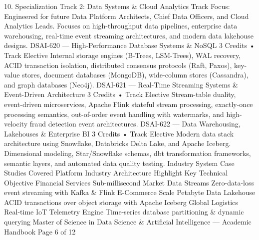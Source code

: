 \documentclass[12pt]{article}
\begin{document}
10. Specialization Track 2: Data Systems \& Cloud Analytics
Track Focus: Engineered for future Data Platform Architects, Chief Data Officers, and Cloud Analytics Leads.
Focuses on high-throughput data pipelines, enterprise data warehousing, real-time event streaming
architectures, and modern data lakehouse designs.
DSAI-620 — High-Performance Database Systems \& NoSQL
3 Credits • Track Elective
Internal storage engines (B-Trees, LSM-Trees), WAL recovery, ACID transaction isolation, distributed consensus
protocols (Raft, Paxos), key-value stores, document databases (MongoDB), wide-column stores (Cassandra), and
graph databases (Neo4j).
DSAI-621 — Real-Time Streaming Systems \& Event-Driven Architecture
3 Credits • Track Elective
Stream-table duality, event-driven microservices, Apache Flink stateful stream processing, exactly-once
processing semantics, out-of-order event handling with watermarks, and high-velocity fraud detection event
architectures.
DSAI-622 — Data Warehousing, Lakehouses \& Enterprise BI
3 Credits • Track Elective
Modern data stack architecture using Snowflake, Databricks Delta Lake, and Apache Iceberg. Dimensional
modeling, Star/Snowflake schemas, dbt transformation frameworks, semantic layers, and automated data
quality testing.
Industry System Case Studies Covered
Platform Industry
Architecture Highlight
Key Technical Objective
Financial Services
Sub-millisecond Market Data Streams
Zero-data-loss event streaming with Kafka \& Flink
E-Commerce Scale
Petabyte Data Lakehouse
ACID transactions over object storage with Apache Iceberg
Global Logistics
Real-time IoT Telemetry Engine
Time-series database partitioning \& dynamic querying
Master of Science in Data Science \& Artificial Intelligence — Academic Handbook
Page 6 of 12
\end{document}
